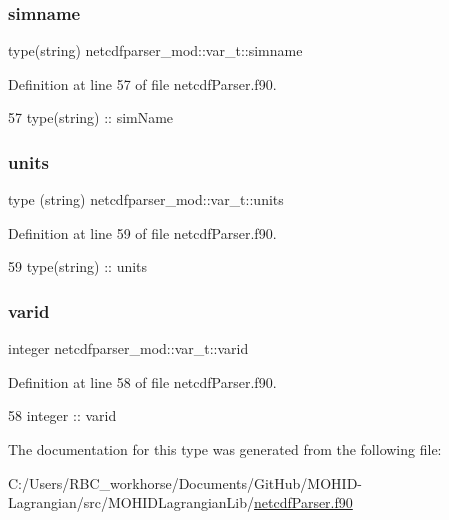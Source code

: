 \subsubsection{\texorpdfstring{simname}{simname}}
{\footnotesize\ttfamily type(string) netcdfparser\+\_\+mod\+::var\+\_\+t\+::simname\hspace{0.3cm}{\ttfamily [private]}}



Definition at line 57 of file netcdf\+Parser.\+f90.


\begin{DoxyCode}
57         \textcolor{keywordtype}{type}(string) :: simName
\end{DoxyCode}
\mbox{\label{structnetcdfparser__mod_1_1var__t_ac7b0d52ef17496213c66b5a34dc8f8b6}} 
\subsubsection{\texorpdfstring{units}{units}}
{\footnotesize\ttfamily type (string) netcdfparser\+\_\+mod\+::var\+\_\+t\+::units\hspace{0.3cm}{\ttfamily [private]}}



Definition at line 59 of file netcdf\+Parser.\+f90.


\begin{DoxyCode}
59         type(string) :: units
\end{DoxyCode}
\mbox{\label{structnetcdfparser__mod_1_1var__t_af3b333b148f6159bade3f9263c03892e}} 
\subsubsection{\texorpdfstring{varid}{varid}}
{\footnotesize\ttfamily integer netcdfparser\+\_\+mod\+::var\+\_\+t\+::varid\hspace{0.3cm}{\ttfamily [private]}}



Definition at line 58 of file netcdf\+Parser.\+f90.


\begin{DoxyCode}
58         \textcolor{keywordtype}{integer} :: varid
\end{DoxyCode}


The documentation for this type was generated from the following file\+:\begin{DoxyCompactItemize}
\item 
C\+:/\+Users/\+R\+B\+C\+\_\+workhorse/\+Documents/\+Git\+Hub/\+M\+O\+H\+I\+D-\/\+Lagrangian/src/\+M\+O\+H\+I\+D\+Lagrangian\+Lib/\mbox{\hyperlink{netcdf_parser_8f90}{netcdf\+Parser.\+f90}}\end{DoxyCompactItemize}
